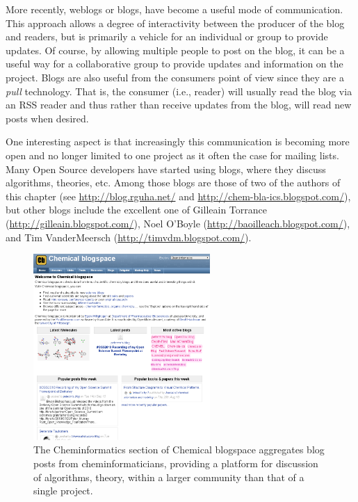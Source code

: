 \documentclass[11pt]{book}
\begin{document}
More recently, weblogs or blogs, have become a useful mode of
communication. This approach allows a degree of interactivity between
the producer of the blog and readers, but is primarily a vehicle for
an individual or group to provide updates. Of course, by allowing
multiple people to post on the blog, it can be a useful way for a
collaborative group to provide updates and information on the
project. Blogs are also useful from the consumers point of view since
they are a \emph{pull} technology. That is, the consumer (i.e.,
reader) will usually read the blog via an RSS reader and thus rather
than receive updates from the blog, will read new posts when desired.

One interesting aspect is that increasingly this communication
is becoming more open and no longer limited to one project as
it often the case for mailing lists. Many Open Source developers
have started using blogs, where they discuss algorithms, theories,
etc. Among those blogs are those of two of the authors of this
chapter (see \url{http://blog.rguha.net/} and
\url{http://chem-bla-ics.blogspot.com/}),
but other blogs include the excellent one of
Gilleain Torrance (\url{http://gilleain.blogspot.com/}),
Noel O'Boyle (\url{http://baoilleach.blogspot.com/}), and
Tim VanderMeersch (\url{http://timvdm.blogspot.com/}).

\begin{figure}[bt]
\begin{center}
\includegraphics[width=0.6\textwidth]{graphics/cb.png}
\end{center}
\caption{The Cheminformatics section of Chemical blogspace
aggregates blog posts from cheminformaticians, providing
a platform for discussion of algorithms, theory, within
a larger community than that of a single project.}
\label{fig:cb}
\end{figure}
\end{document}
